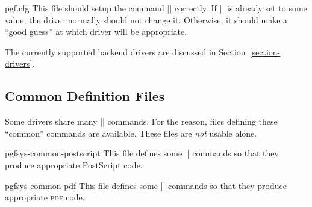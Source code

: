 \begin{filedescription}{pgf.cfg}
  This file should setup the command |\pgfsysdriver| correctly. If
  |\pgfsysdriver| is already set to some value, the driver normally
  should not change it. Otherwise, it should make a ``good guess'' at
  which driver will be appropriate.
\end{filedescription}


The currently supported backend drivers are discussed in
Section~\ref{section-drivers}.


\subsection{Common Definition Files}

Some drivers share many |\pgfsys@| commands. For the reason, files
defining these ``common'' commands are available. These files are
\emph{not} usable alone.

\begin{filedescription}{pgfsys-common-postscript}
  This file defines some |\pgfsys@| commands so that they produce
  appropriate PostScript code.
\end{filedescription}

\begin{filedescription}{pgfsys-common-pdf}
  This file defines some |\pgfsys@| commands so that they produce
  appropriate \textsc{pdf} code.
\end{filedescription}



